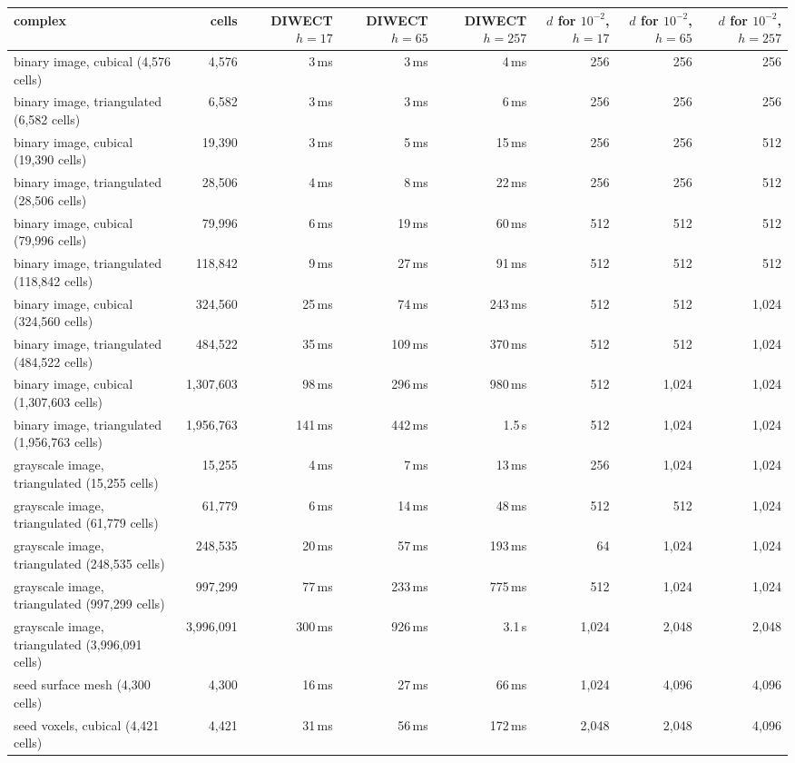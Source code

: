\begin{tabular}{lrrrrrrr}
\toprule
complex & cells & DIWECT $h=17$ & DIWECT $h=65$ & DIWECT $h=257$ & $d$ for $10^{-2}$, $h=17$ & $d$ for $10^{-2}$, $h=65$ & $d$ for $10^{-2}$, $h=257$ \\
\midrule
binary image, cubical (4,576 cells) & 4,576 & 3\,ms & 3\,ms & 4\,ms & 256 & 256 & 256 \\
binary image, triangulated (6,582 cells) & 6,582 & 3\,ms & 3\,ms & 6\,ms & 256 & 256 & 256 \\
binary image, cubical (19,390 cells) & 19,390 & 3\,ms & 5\,ms & 15\,ms & 256 & 256 & 512 \\
binary image, triangulated (28,506 cells) & 28,506 & 4\,ms & 8\,ms & 22\,ms & 256 & 256 & 512 \\
binary image, cubical (79,996 cells) & 79,996 & 6\,ms & 19\,ms & 60\,ms & 512 & 512 & 512 \\
binary image, triangulated (118,842 cells) & 118,842 & 9\,ms & 27\,ms & 91\,ms & 512 & 512 & 512 \\
binary image, cubical (324,560 cells) & 324,560 & 25\,ms & 74\,ms & 243\,ms & 512 & 512 & 1,024 \\
binary image, triangulated (484,522 cells) & 484,522 & 35\,ms & 109\,ms & 370\,ms & 512 & 512 & 1,024 \\
binary image, cubical (1,307,603 cells) & 1,307,603 & 98\,ms & 296\,ms & 980\,ms & 512 & 1,024 & 1,024 \\
binary image, triangulated (1,956,763 cells) & 1,956,763 & 141\,ms & 442\,ms & 1.5\,s & 512 & 1,024 & 1,024 \\
grayscale image, triangulated (15,255 cells) & 15,255 & 4\,ms & 7\,ms & 13\,ms & 256 & 1,024 & 1,024 \\
grayscale image, triangulated (61,779 cells) & 61,779 & 6\,ms & 14\,ms & 48\,ms & 512 & 512 & 1,024 \\
grayscale image, triangulated (248,535 cells) & 248,535 & 20\,ms & 57\,ms & 193\,ms & 64 & 1,024 & 1,024 \\
grayscale image, triangulated (997,299 cells) & 997,299 & 77\,ms & 233\,ms & 775\,ms & 512 & 1,024 & 1,024 \\
grayscale image, triangulated (3,996,091 cells) & 3,996,091 & 300\,ms & 926\,ms & 3.1\,s & 1,024 & 2,048 & 2,048 \\
seed surface mesh (4,300 cells) & 4,300 & 16\,ms & 27\,ms & 66\,ms & 1,024 & 4,096 & 4,096 \\
seed voxels, cubical (4,421 cells) & 4,421 & 31\,ms & 56\,ms & 172\,ms & 2,048 & 2,048 & 4,096 \\

\end{tabular}
